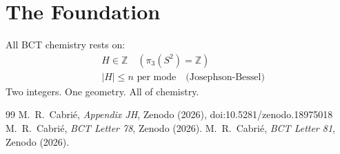 \documentclass[aps,prl,twocolumn,showpacs,superscriptaddress]{revtex4-2}
\begin{document}
\section{The Foundation}

All BCT chemistry rests on:
\begin{align}
    &H \in \mathbb{Z} \quad (\pi_3(S^2)=\mathbb{Z})\\
    &|H| \leq n \text{ per mode} \quad\text{(Josephson-Bessel)}
\end{align}
Two integers. One geometry. All of chemistry.

\begin{thebibliography}{99}
 M.~R.~Cabri\'e, \textit{Appendix JH}, Zenodo (2026),
doi:10.5281/zenodo.18975018
 M.~R.~Cabri\'e, \textit{BCT Letter 78}, Zenodo (2026).
 M.~R.~Cabri\'e, \textit{BCT Letter 81}, Zenodo (2026).
\end{thebibliography}
\end{document}
